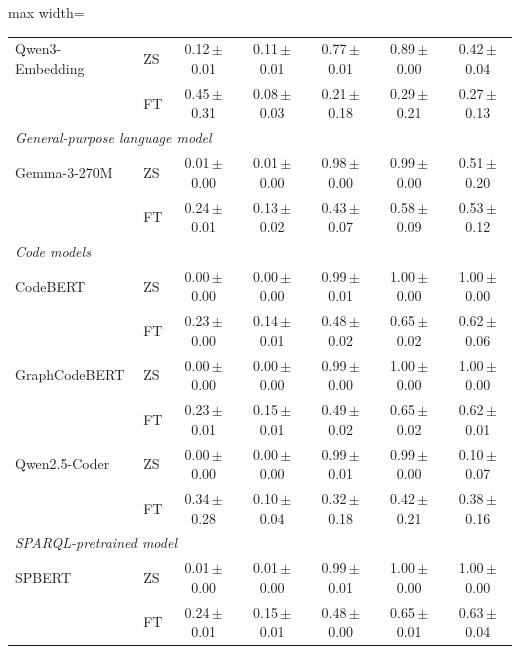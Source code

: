 \begin{table}[p]
\begin{adjustbox}{max width=\textwidth}
\begin{tabular}{ll ccccc}
Qwen3-Embedding & ZS & 0.12\,{\scriptsize$\pm$0.01} & 0.11\,{\scriptsize$\pm$0.01} & 0.77\,{\scriptsize$\pm$0.01} & 0.89\,{\scriptsize$\pm$0.00} & 0.42\,{\scriptsize$\pm$0.04}\\
 & FT & 0.45\,{\scriptsize$\pm$0.31} & 0.08\,{\scriptsize$\pm$0.03} & 0.21\,{\scriptsize$\pm$0.18} & 0.29\,{\scriptsize$\pm$0.21} & 0.27\,{\scriptsize$\pm$0.13}\\
\midrule
\multicolumn{7}{l}{\textit{General-purpose language model}}\\
Gemma-3-270M & ZS & 0.01\,{\scriptsize$\pm$0.00} & 0.01\,{\scriptsize$\pm$0.00} & 0.98\,{\scriptsize$\pm$0.00} & 0.99\,{\scriptsize$\pm$0.00} & 0.51\,{\scriptsize$\pm$0.20}\\
 & FT & 0.24\,{\scriptsize$\pm$0.01} & 0.13\,{\scriptsize$\pm$0.02} & 0.43\,{\scriptsize$\pm$0.07} & 0.58\,{\scriptsize$\pm$0.09} & 0.53\,{\scriptsize$\pm$0.12}\\
\midrule
\multicolumn{7}{l}{\textit{Code models}}\\
CodeBERT & ZS & 0.00\,{\scriptsize$\pm$0.00} & 0.00\,{\scriptsize$\pm$0.00} & 0.99\,{\scriptsize$\pm$0.01} & 1.00\,{\scriptsize$\pm$0.00} & 1.00\,{\scriptsize$\pm$0.00}\\
 & FT & 0.23\,{\scriptsize$\pm$0.00} & 0.14\,{\scriptsize$\pm$0.01} & 0.48\,{\scriptsize$\pm$0.02} & 0.65\,{\scriptsize$\pm$0.02} & 0.62\,{\scriptsize$\pm$0.06}\\
GraphCodeBERT & ZS & 0.00\,{\scriptsize$\pm$0.00} & 0.00\,{\scriptsize$\pm$0.00} & 0.99\,{\scriptsize$\pm$0.00} & 1.00\,{\scriptsize$\pm$0.00} & 1.00\,{\scriptsize$\pm$0.00}\\
 & FT & 0.23\,{\scriptsize$\pm$0.01} & 0.15\,{\scriptsize$\pm$0.01} & 0.49\,{\scriptsize$\pm$0.02} & 0.65\,{\scriptsize$\pm$0.02} & 0.62\,{\scriptsize$\pm$0.01}\\
Qwen2.5-Coder & ZS & 0.00\,{\scriptsize$\pm$0.00} & 0.00\,{\scriptsize$\pm$0.00} & 0.99\,{\scriptsize$\pm$0.01} & 0.99\,{\scriptsize$\pm$0.00} & 0.10\,{\scriptsize$\pm$0.07}\\
 & FT & 0.34\,{\scriptsize$\pm$0.28} & 0.10\,{\scriptsize$\pm$0.04} & 0.32\,{\scriptsize$\pm$0.18} & 0.42\,{\scriptsize$\pm$0.21} & 0.38\,{\scriptsize$\pm$0.16}\\
\midrule
\multicolumn{7}{l}{\textit{SPARQL-pretrained model}}\\
SPBERT & ZS & 0.01\,{\scriptsize$\pm$0.00} & 0.01\,{\scriptsize$\pm$0.00} & 0.99\,{\scriptsize$\pm$0.01} & 1.00\,{\scriptsize$\pm$0.00} & 1.00\,{\scriptsize$\pm$0.00}\\
 & FT & 0.24\,{\scriptsize$\pm$0.01} & 0.15\,{\scriptsize$\pm$0.01} & 0.48\,{\scriptsize$\pm$0.00} & 0.65\,{\scriptsize$\pm$0.01} & 0.63\,{\scriptsize$\pm$0.04}\\
\bottomrule
\end{tabular}
\end{adjustbox}
\end{table}
